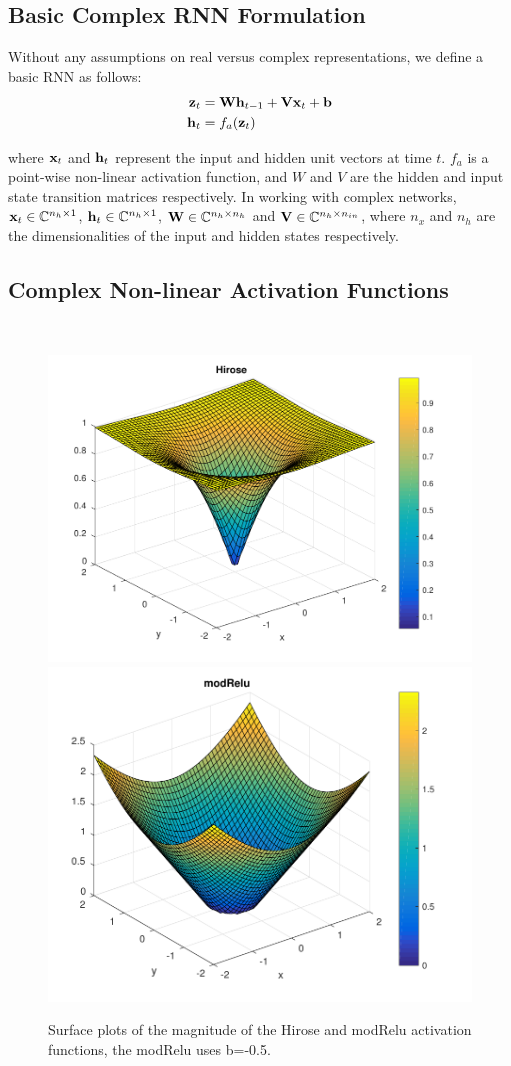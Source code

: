 \documentclass{article}
\begin{document}
\subsection{Basic Complex RNN Formulation}

Without any assumptions on real versus complex representations, we define a basic RNN as follows: 
\begin{align}
    \mathbf{z}_{t} &= \mathbf{W} \mathbf{h}_{t-1} + \mathbf{V} \mathbf{x}_{t} + \mathbf{b} \label{eq:basicRNN1}\\
    \mathbf{h}_{t} &= f_a(\mathbf{z}_{t}) \label{eq:basicRNN2}
\end{align}

where $\mathbf{x}_t$ and $\mathbf{h}_t$ represent the input and hidden unit vectors at time $t$.  $f_a$ is a point-wise non-linear activation function, and $W$ and $V$ are the hidden and input state transition matrices respectively.  In working with complex networks, $\mathbf{x}_t \in \mathbb{C}^{n_h \times 1}$, $\mathbf{h}_t \in \mathbb{C}^{n_h \times 1}$, $\mathbf{W} \in \mathbb{C}^{n_h \times n_h}$ and $\mathbf{V} \in \mathbb{C}^{n_h \times n_{in}}$, where $n_x$ and $n_h$ are the dimensionalities of the input and hidden states respectively.

\subsection{Complex Non-linear Activation Functions}~\label{sec:nonlinearity}
\begin{figure}
    \centering
    \includegraphics[width=0.45\linewidth]{./img/Hirose_slice.pdf}
    \includegraphics[width=0.45\linewidth]{./img/modRelu_slice.pdf}
    \caption{Surface plots of the magnitude of the Hirose and modRelu activation functions, the modRelu uses b=-0.5.}
    \label{fig:hiroseModRelu}
\end{figure}
\end{document}
